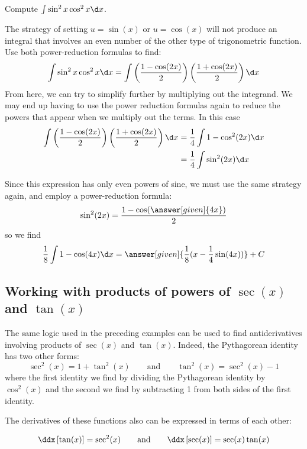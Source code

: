 \documentclass{ximera}
\begin{document}
\begin{example}
  Compute $  \int \sin^2x\cos^2x\d x$.
  
  \begin{explanation} 
    The strategy of setting $u=\sin(x)$ or $u=\cos(x)$ will not produce an integral that involves an even number of the other type of trigonometric function. Use both power-reduction formulas to find:
    \[
    \int \sin^2x\cos^2x\d x=\int \left( \frac{1-\cos(2x)}{2}\right)
    \left(\frac{1+\cos(2x)}{2}\right) \d x
    \]
    From here, we can try to simplify further by multiplying out the integrand. We may end up having to
    use the power reduction formulas again to reduce the powers that appear when we multiply out the terms.  In this case
    \begin{align*}
      \int \left(\frac{1-\cos(2x)}{2}\right) \left( \frac{1+\cos(2x)}{2}\right) \d x &= \frac{1}{4} \int 1-\cos^2(2x) \d x\\
      &= \frac{1}{4} \int \sin^2(2x) \d x
    \end{align*}
    
    Since this expression has only even powers of sine, we must use
    the same strategy again, and employ a power-reduction formula:
    \[
    \sin^2(2x) = \frac{1-\cos(\answer[given]{4x})}{2}
    \]
    so we find
    \[
    \frac{1}{8}\int 1-\cos(4x) \d x = \answer[given]{\frac{1}{8}(x - \frac{1}{4}\sin(4x))} + C
    \]
  \end{explanation}
\end{example}




\subsection{Working with products of powers of $\sec(x)$ and $\tan(x)$}

The same logic used in the preceding examples can be used to find antiderivatives involving products of $\sec(x)$ and $\tan(x)$.  Indeed, the Pythagorean identity has two other forms:
\[
\sec^2(x) = 1 + \tan^2(x)  \qquad\text{and}\qquad \tan^2(x) = \sec^2(x) - 1  
\]
where the first identity we find by dividing the Pythagorean identity by
$\cos^2(x)$ and the second we find by subtracting 1 from both sides of the first identity. 

The derivatives of these functions also can be expressed in terms of each other:

\[
\ddx \left[\tan(x)\right] = \sec^2(x) \qquad\text{and}\qquad \ddx \left[\sec(x)\right] = \sec(x)\tan(x)
\]
\end{document}
